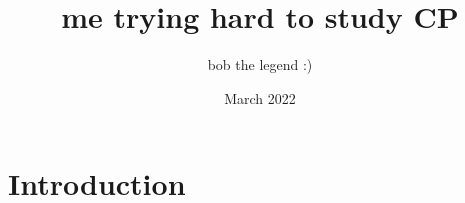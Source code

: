 \documentclass{article}
\title{me trying hard to study CP}
\author{bob the legend :)}
\date{March 2022}
\begin{document}
\maketitle

\section{Introduction}
\end{document}
